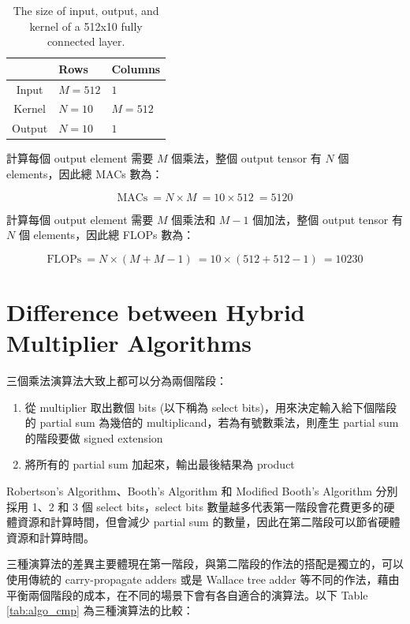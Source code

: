 \documentclass[12pt]{article}
\begin{document}
\begin{table}[h]
    \centering
    \caption{The size of input, output, and kernel of a 512x10 fully connected layer.}
    \begin{tabular}{cll} \hline
           & Rows    & Columns  \\ \hline
    Input  & $M=512$  & $1$      \\
    Kernel & $N=10$ & $M=512$   \\
    Output & $N=10$ & $1$      \\ \hline
    \end{tabular}
    \label{tab:matmul}
\end{table}


計算每個 output element 需要 $M$ 個乘法，整個 output tensor 有 $N$ 個 elements，因此總 MACs 數為：

$$
\text{MACs} \
= N \times M \
= 10 \times 512 \
= 5120
$$

計算每個 output element 需要 $M$ 個乘法和 $M - 1$ 個加法，整個 output tensor 有 $N$ 個 elements，因此總 FLOPs 數為：

$$
\text{FLOPs} \
= N \times (M + M - 1) \
= 10 \times (512 + 512 - 1) \
= 10230
$$

\section{Difference between Hybrid Multiplier Algorithms}

三個乘法演算法大致上都可以分為兩個階段：

\begin{enumerate}
    \item 從 multiplier 取出數個 bits (以下稱為 select bits)，用來決定輸入給下個階段的 partial sum 為幾倍的 multiplicand，若為有號數乘法，則產生 partial sum 的階段要做 signed extension
    \item 將所有的 partial sum 加起來，輸出最後結果為 product
\end{enumerate}

Robertson's Algorithm、Booth's Algorithm 和 Modified Booth's Algorithm 分別採用 1、2 和 3 個 select bits，select bits 數量越多代表第一階段會花費更多的硬體資源和計算時間，但會減少 partial sum 的數量，因此在第二階段可以節省硬體資源和計算時間。

三種演算法的差異主要體現在第一階段，與第二階段的作法的搭配是獨立的，可以使用傳統的 carry-propagate adders 或是 Wallace tree adder 等不同的作法，藉由平衡兩個階段的成本，在不同的場景下會有各自適合的演算法。以下 Table \ref{tab:algo_cmp} 為三種演算法的比較：
\end{document}
